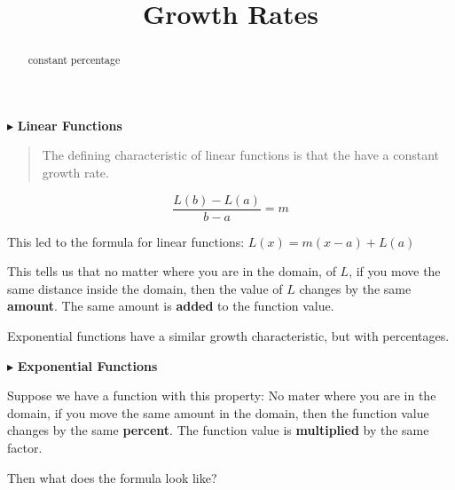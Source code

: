\documentclass{ximera}
\title{Growth Rates}
\begin{document}
\begin{abstract}
constant percentage
\end{abstract}
\maketitle










$\blacktriangleright$ \textbf{\textcolor{purple!85!blue}{Linear Functions}}   


\begin{quote}
The defining characteristic of linear functions is that the have a constant growth rate.
\end{quote}





\[   \frac{L(b)-L(a)}{b-a} = m       \]

This led to the formula for linear functions:  $L(x) = m(x-a) + L(a)$


This tells us that no matter where you are in the domain, of $L$, if you move the same distance inside the domain, then the value of $L$ changes by the same \textbf{\textcolor{purple!85!blue}{amount}}. The same amount is \textbf{added} to the function value.






Exponential functions have a similar growth characteristic, but with percentages. 



$\blacktriangleright$ \textbf{\textcolor{purple!85!blue}{Exponential Functions}} 



Suppose we have a function with this property:  No mater where you are in the domain, if you move the same amount in the domain, then the function value changes by the same \textbf{\textcolor{purple!85!blue}{percent}}.  The function value is \textbf{multiplied} by the same factor. 

Then what does the formula look like?
\end{document}
